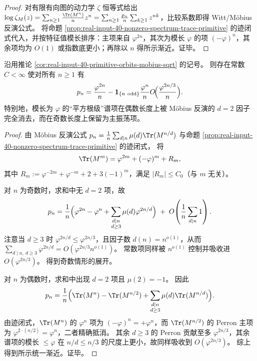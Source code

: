 \begin{proof}
对有限有向图的动力学 \(\zeta\) 恒等式给出
\(
\log \zeta_M(z)=\sum_{n\ge 1}\frac{\Tr(M^n)}{n}z^n=\sum_{n\ge 1}\frac{p_n}{n}\sum_{k\ge 1}z^{nk}
\)，比较系数即得 Witt/Möbius 反演公式。
将命题 \ref{prop:real-input-40-nonzero-spectrum-trace-primitive} 的迹闭式代入，并按特征值模长排序：主项来自 \(\varphi^{2n}\)，其次为模长 \(\varphi\) 的项 \((-\varphi)^n\)，其余项均为 \(O(1)\) 或指数底更小；再除以 \(n\) 得所示渐近。证毕。
\end{proof}

\begin{corollary}\label{cor:real-input-40-primitive-orbits-parity-cancellation}
沿用推论 \ref{cor:real-input-40-primitive-orbits-mobius-sqrt} 的记号。
则存在常数 \(C<\infty\) 使对所有 \(n\ge 1\) 有
\[
p_n=\frac{\varphi^{2n}}{n}-\mathbf 1_{\{n\ \mathrm{odd}\}}\frac{\varphi^{n}}{n}
O\!\Bigl(\frac{\varphi^{2n/3}}{n}\Bigr).
\]
特别地，模长为 \(\varphi\) 的“平方根级”谱项在偶数长度上被 Möbius 反演的 \(d=2\) 因子完全消去，而在奇数长度上保留为主振荡项。
\end{corollary}
\begin{proof}
由 Möbius 反演公式
\(
p_n=\frac1n\sum_{d\mid n}\mu(d)\Tr(M^{n/d})
\)
与命题 \ref{prop:real-input-40-nonzero-spectrum-trace-primitive} 的迹闭式，
将
\[
\Tr(M^m)=\varphi^{2m}+(-\varphi)^m+R_m,
\]
其中 \(R_m:=\varphi^{-2m}+\varphi^{-m}+2+3(-1)^m\)，满足 \(|R_m|\le C_0\)（与 \(m\) 无关）。
\par
对 \(n\) 为奇数时，求和中无 \(d=2\) 项，故
\[
p_n=\frac1n\Bigl(\varphi^{2n}-\varphi^n+\sum_{\substack{d\mid n\\ d\ge 3}}\mu(d)\varphi^{2n/d}\Bigr)
\;+\;
O\!\left(\frac{1}{n}\sum_{d\mid n}1\right).
\]
注意当 \(d\ge 3\) 时 \(\varphi^{2n/d}\le \varphi^{2n/3}\)，且因子数 \(d(n)=n^{o(1)}\)，从而
\(
\sum_{d\mid n,\ d\ge 3}\varphi^{2n/d}
=O(\varphi^{2n/3}n^{o(1)})
\)。
常数项同样被 \(n^{o(1)}\) 控制并吸收进 \(O(\varphi^{2n/3})\)。
得到奇数情形的展开。
\par
对 \(n\) 为偶数时，求和中出现 \(d=2\) 项且 \(\mu(2)=-1\)。
因此
\[
p_n=\frac1n\Bigl(\Tr(M^n)-\Tr(M^{n/2})+\sum_{\substack{d\mid n\\ d\ge 3}}\mu(d)\Tr(M^{n/d})\Bigr).
\]
由迹闭式，\(\Tr(M^n)\) 的 \(\varphi^n\) 项为 \((-\varphi)^n=+\varphi^n\)，而 \(\Tr(M^{n/2})\) 的 Perron 主项为 \(\varphi^{2\cdot(n/2)}=\varphi^n\)，二者精确抵消。
其余 \(d\ge 3\) 的 Perron 贡献至多 \(\varphi^{2n/3}\)，其余谱项的模长 \(\le\varphi\) 在 \(n/d\le n/3\) 的尺度上更小，故同样吸收到 \(O(\varphi^{2n/3})\)。
综上得到所示统一渐近。证毕。
\end{proof}

